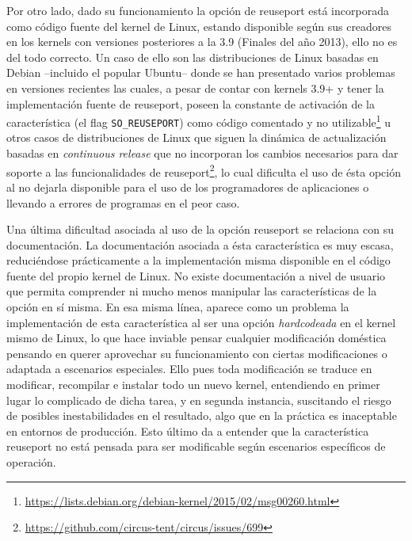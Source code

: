 Por otro lado, dado su funcionamiento la opción de reuseport está incorporada como código fuente del kernel de Linux, estando disponible según sus creadores en los kernels con versiones posteriores a la 3.9 (Finales del año 2013), ello no es del todo correcto. Un caso de ello son las distribuciones de Linux basadas en Debian --incluido el popular Ubuntu-- donde se han presentado varios problemas en versiones recientes las cuales, a pesar de contar con kernels 3.9+ y tener la implementación fuente de reuseport, poseen la constante de activación de la característica (el flag \verb=SO_REUSEPORT=) como código comentado y no utilizable\footnote{\url{https://lists.debian.org/debian-kernel/2015/02/msg00260.html}} u otros casos de distribuciones de Linux que siguen la dinámica de actualización basadas en \emph{continuous release} que no incorporan los cambios necesarios para dar soporte a las funcionalidades de reuseport\footnote{\url{https://github.com/circus-tent/circus/issues/699}}, lo cual dificulta el uso de ésta opción al no dejarla disponible para el uso de los programadores de aplicaciones o llevando a errores de programas en el peor caso.

Una última dificultad asociada al uso de la opción reuseport se relaciona con su documentación. La documentación asociada a ésta característica es muy escasa, reduciéndose prácticamente a la implementación misma disponible en el código fuente del propio kernel de Linux. No existe documentación a nivel de usuario que permita comprender ni mucho menos manipular las características de la opción en sí misma. En esa misma línea, aparece como un problema la implementación de esta característica al ser una opción \emph{hardcodeada} en el kernel mismo de Linux, lo que hace inviable pensar cualquier modificación doméstica pensando en querer aprovechar su funcionamiento con ciertas modificaciones o adaptada a escenarios especiales. Ello pues toda modificación se traduce en modificar, recompilar e instalar todo un nuevo kernel, entendiendo en primer lugar lo complicado de dicha tarea, y en segunda instancia, suscitando el riesgo de posibles inestabilidades en el resultado, algo que en la práctica es inaceptable en entornos de producción. Esto último da a entender que la característica reuseport no está pensada para ser modificable según escenarios específicos de operación.
